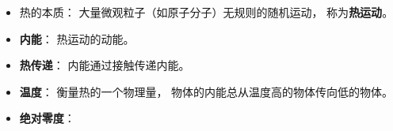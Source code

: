
\begin{issues}
\issueDraft
\end{issues}

\begin{itemize}
\item 热的本质： 大量微观粒子（如原子分子）无规则的随机运动， 称为\textbf{热运动}。
\item \textbf{内能}： 热运动的动能。
\item \textbf{热传递}： 内能通过接触传递内能。
\item \textbf{温度}： 衡量热的一个物理量， 物体的内能总从温度高的物体传向低的物体。
\item \textbf{绝对零度}： 
\end{itemize}
